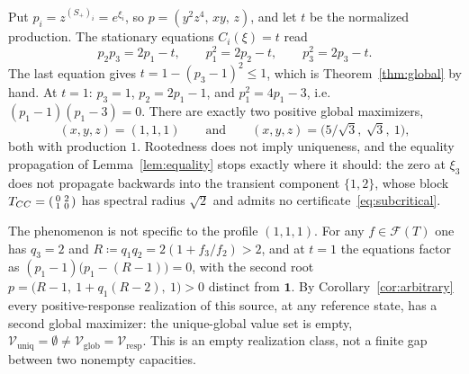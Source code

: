 \documentclass[11pt,a4paper]{article}
\theoremstyle{plain}
\theoremstyle{definition}
\theoremstyle{remark}
\numberwithin{equation}{section}
\newcommand{\Sp}{S_{+}}
\newcommand{\one}{\mathbf{1}}
\newcommand{\cone}{\mathcal{F}}
\newcommand{\Vresp}{\mathcal{V}_{\mathrm{resp}}}
\newcommand{\Vglob}{\mathcal{V}_{\mathrm{glob}}}
\newcommand{\Vuniq}{\mathcal{V}_{\mathrm{uniq}}}
\begin{document}
Put $p_i=z^{(\Sp)_i}=e^{\xi_i}$, so $p=(y^2z^4,\,xy,\,z)$, and let $t$ be the normalized production. The stationary equations $C_i(\xi)=t$ read
\begin{equation}\label{eq:tworoots}
 p_2p_3=2p_1-t,\qquad p_1^2=2p_2-t,\qquad p_3^2=2p_3-t .
\end{equation}
The last equation gives $t=1-(p_3-1)^2\le1$, which is Theorem~\ref{thm:global} by hand. At $t=1$: $p_3=1$, $p_2=2p_1-1$, and $p_1^2=4p_1-3$, i.e.\ $(p_1-1)(p_1-3)=0$. There are exactly two positive global maximizers,
\begin{equation}\label{eq:states}
 (x,y,z)=(1,1,1)\qquad\text{and}\qquad(x,y,z)=\big(5/\sqrt3,\ \sqrt3,\ 1\big),
\end{equation}
both with production $1$. Rootedness does not imply uniqueness, and the equality propagation of Lemma~\ref{lem:equality} stops exactly where it should: the zero at $\xi_3$ does not propagate backwards into the transient component $\{1,2\}$, whose block $T_{CC}=\begin{psmallmatrix}0&2\\1&0\end{psmallmatrix}$ has spectral radius $\sqrt2$ and admits no certificate~\eqref{eq:subcritical}.

The phenomenon is not specific to the profile $(1,1,1)$. For any $f\in\cone(T)$ one has $q_3=2$ and $R\coloneqq q_1q_2=2(1+f_3/f_2)>2$, and at $t=1$ the equations factor as $(p_1-1)\big(p_1-(R-1)\big)=0$, with the second root $p=\big(R-1,\ 1+q_1(R-2),\ 1\big)>0$ distinct from $\one$. By Corollary~\ref{cor:arbitrary} every positive-response realization of this source, at any reference state, has a second global maximizer: the unique-global value set is empty, $\Vuniq=\emptyset\ne\Vglob=\Vresp$. This is an empty realization class, not a finite gap between two nonempty capacities.
\end{document}
